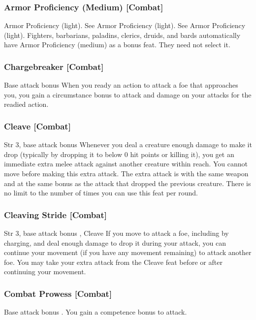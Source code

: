 \subsubsection{Armor Proficiency (Medium) [Combat]}
 Armor Proficiency (light).
 See Armor Proficiency (light).
 See Armor Proficiency (light).
 Fighters, barbarians, paladins, clerics, druids, and bards automatically have Armor Proficiency (medium) as a bonus feat. They need not select it.

\subsubsection{Chargebreaker [Combat]}
 Base attack bonus 
 When you ready an action to attack a foe that approaches you, you gain a  circumstance bonus to attack and damage on your attacks for the readied action.

\subsubsection{Cleave [Combat]}
 Str 3, base attack bonus 
 Whenever you deal a creature enough damage to make it drop (typically by dropping it to below 0 hit points or killing it), you get an immediate extra melee attack against another creature within reach. You cannot move before making this extra attack. The extra attack is with the same weapon and at the same bonus as the attack that dropped the previous creature. There is no limit to the number of times you can use this feat per round.

\subsubsection{Cleaving Stride [Combat]}
 Str 3, base attack bonus , Cleave
 If you move to attack a foe, including by charging, and deal enough damage to drop it during your attack, you can continue your movement (if you have any movement remaining) to attack another foe. You may take your extra attack from the Cleave feat before or after continuing your movement.

\subsubsection{Combat Prowess [Combat]}
\featpre Base attack bonus .
\featben You gain a  competence bonus to attack.

